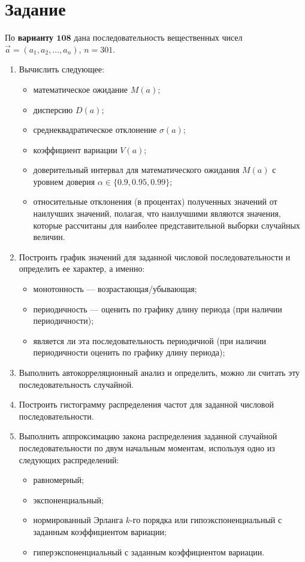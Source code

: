 \section{Задание}

По \textbf{варианту \( \mathbf{108} \)} дана последовательность вещественных чисел $\vec{a} = (a_1, a_2, \ldots, a_n)$, \( n = 301 \). 

\begin{enumerate}
    \item Вычислить следующее:
    \begin{itemize}
        \item математическое ожидание \( M(a) \);
        \item дисперсию \( D(a) \);
        \item среднеквадратическое отклонение \( \sigma(a) \);
        \item коэффициент вариации \( V(a) \);
        \item доверительный интервал для математического ожидания \( M(a) \) с уровнем доверия \( \alpha \in \{0.9, 0.95, 0.99\} \);
        \item относительные отклонения (в процентах) полученных значений от наилучших значений, полагая, что наилучшими являются значения, которые рассчитаны для наиболее представительной выборки случайных величин.
    \end{itemize}

    \item Построить график значений для заданной числовой последовательности и определить ее характер, а именно:
    \begin{itemize}
        \item монотонность --- возрастающая/убывающая;
        \item периодичность --- оценить по графику длину периода (при наличии периодичности);
        \item является ли эта последовательность периодичной (при наличии периодичности оценить по графику длину периода);
    \end{itemize}

    \item Выполнить автокорреляционный анализ и определить, можно ли считать эту последовательность случайной.

    \item Построить гистограмму распределения частот для заданной числовой последовательности.

    \item Выполнить аппроксимацию закона распределения заданной случайной последовательности по двум начальным моментам, используя одно из следующих распределений:
    \begin{itemize}
        \item равномерный;
        \item экспоненциальный;
        \item нормированный Эрланга $k$-го порядка или гипоэкспоненциальный с заданным коэффициентом вариации;
        \item гиперэкспоненциальный с заданным коэффициентом вариации.
    \end{itemize}


\end{enumerate}
